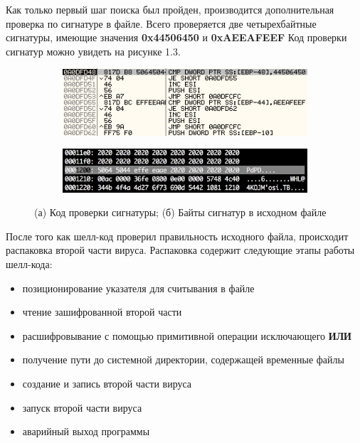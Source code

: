 Как только первый шаг поиска был пройден, производится дополнительная проверка по сигнатуре в файле.
Всего проверяется две четырехбайтные сигнатуры, имеющие значения \textbf{0x44506450} и \textbf{0xAEEAFEEF}
Код проверки сигнатур можно увидеть на рисунке 1.3.

\begin{figure}[ht]
    \centering
    \begin{subfigure}[h]{0.6\textwidth}
    \centering
        \includegraphics[scale=0.7]{1.pdf/pasted-image-25.png}
        \caption{}
        \vspace*{5mm}
    \end{subfigure}
    \begin{subfigure}[h]{0.6\textwidth}
    \centering
        \includegraphics[scale=0.7]{1.pdf/pasted-image-27.png}
        \caption{}
    \end{subfigure}
    \caption{(а) Код проверки сигнатуры; (б) Байты сигнатур в исходном файле}
    \label{fig_parsetree}
\end{figure}

После того как шелл-код проверил правильность исходного файла, происходит распаковка второй части вируса.
Распаковка содержит следующие этапы работы шелл-кода:
\begin{itemize}
\item позиционирование указателя для считывания в файле
\item чтение зашифрованной второй части
\item расшифровывание с помощью примитивной операции исключающего \textbf{ИЛИ}
\item получение пути до системной директории, содержащей временные файлы
\item создание и запись второй части вируса
\item запуск второй части вируса
\item аварийный выход программы
\end{itemize}

